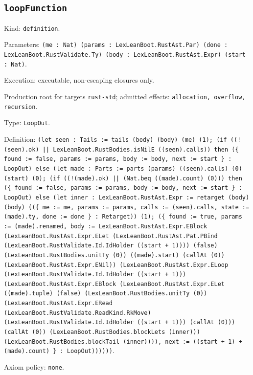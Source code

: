 \documentclass[11pt]{article}
\begin{document}
\subsection*{\texttt{loopFunction}}
\noindent Kind: \texttt{definition}.\par
\noindent Parameters: \texttt{(me : Nat) (params : LexLeanBoot.RustAst.Par) (done : LexLeanBoot.RustValidate.Ty) (body : LexLeanBoot.RustAst.Expr) (start : Nat)}.\par
\noindent Execution: executable, non-escaping closures only.\par
\noindent Production root for targets \texttt{rust-std}; admitted effects: \texttt{allocation, overflow, recursion}.\par
\noindent Type: \texttt{LoopOut}.\par
\noindent Definition: \texttt{(let seen : Tails := tails (body) (body) (me) (1); (if ((!(seen).ok) || LexLeanBoot.RustBodies.isNilE ((seen).calls)) then (\{ found := false, params := params, body := body, next := start \} : LoopOut) else (let made : Parts := parts (params) ((seen).calls) (0) (start) (0); (if ((!(made).ok) || (Nat.beq ((made).count) (0))) then (\{ found := false, params := params, body := body, next := start \} : LoopOut) else (let inner : LexLeanBoot.RustAst.Expr := retarget (body) (body) ((\{ me := me, params := params, calls := (seen).calls, state := (made).ty, done := done \} : Retarget)) (1); (\{ found := true, params := (made).renamed, body := LexLeanBoot.RustAst.Expr.EBlock (LexLeanBoot.RustAst.Expr.ELet (LexLeanBoot.RustAst.Pat.PBind (LexLeanBoot.RustValidate.Id.IdHolder ((start + 1)))) (false) (LexLeanBoot.RustBodies.unitTy (0)) ((made).start) (callAt (0)) (LexLeanBoot.RustAst.Expr.ENil)) (LexLeanBoot.RustAst.Expr.ELoop (LexLeanBoot.RustValidate.Id.IdHolder ((start + 1))) (LexLeanBoot.RustAst.Expr.EBlock (LexLeanBoot.RustAst.Expr.ELet ((made).tuple) (false) (LexLeanBoot.RustBodies.unitTy (0)) (LexLeanBoot.RustAst.Expr.ERead (LexLeanBoot.RustValidate.ReadKind.RkMove) (LexLeanBoot.RustValidate.Id.IdHolder ((start + 1))) (callAt (0))) (callAt (0)) (LexLeanBoot.RustBodies.blockLets (inner))) (LexLeanBoot.RustBodies.blockTail (inner)))), next := ((start + 1) + (made).count) \} : LoopOut))))))}.\par
\noindent Axiom policy: \texttt{none}.\par
\end{document}
